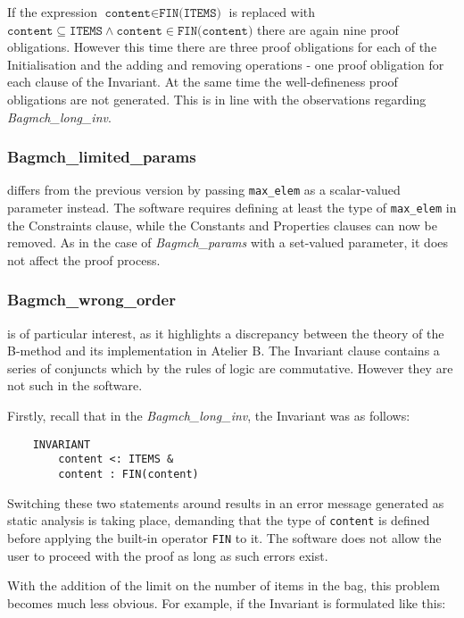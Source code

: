 \documentclass[11pt,journal]{IEEEtran}
\begin{document}
	If the expression $\texttt{content} \in \texttt{FIN(ITEMS)}$ is replaced with $\texttt{content} \subseteq \texttt{ITEMS} \wedge \texttt{content} \in \texttt{FIN(content)}$ there are again nine proof obligations. However this time there are three proof obligations for each of the Initialisation and the adding and removing operations - one proof obligation for each clause of the Invariant. At the same time the well-defineness proof obligations are not generated. This is in line with the observations regarding \emph{Bagmch\_long\_inv}.

	\subsubsection{Bagmch\_limited\_params} differs from the previous version by passing \texttt{max\_elem} as a scalar-valued parameter instead. The software requires defining at least the type of \texttt{max\_elem} in the Constraints clause, while the Constants and Properties clauses can now be removed. As in the case of \emph{Bagmch\_params} with a set-valued parameter, it does not affect the proof process.
	
	\subsubsection{Bagmch\_wrong\_order} is of particular interest, as it highlights a discrepancy between the theory of the B-method and its implementation in Atelier B. The Invariant clause contains a series of conjuncts which by the rules of logic are commutative. However they are not such in the software.
	
	Firstly, recall that in the \emph{Bagmch\_long\_inv}, the Invariant was as follows:
	
	\begin{lstlisting}
	INVARIANT
		content <: ITEMS &
		content : FIN(content)
	\end{lstlisting}
	
	Switching these two statements around results in an error message generated as static analysis is taking place, demanding that the type of \texttt{content} is defined before applying the built-in operator \texttt{FIN} to it. The software does not allow the user to proceed with the proof as long as such errors exist.
	
	With the addition of the limit on the number of items in the bag, this problem becomes much less obvious. For example, if the Invariant is formulated like this:
	
\end{document}

